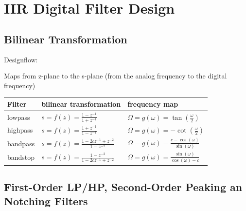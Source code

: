 \section{IIR Digital Filter Design}
\subsection{Bilinear Transformation}
Designflow:
\begin{center}

\end{center}
Maps from z-plane to the s-plane (from the analog frequency to the digital
frequency)

\begin{tabularx}{0.8\textwidth}{|l|X|X|}
	\hline
	\textbf{Filter} & \textbf{bilinear transformation} & \textbf{frequency map}
	\\ \hline
	lowpass &
	$s = f(z) = \frac{1 - z^{-1}}{1 + z^{-1}}$ &
	$ \Omega = g(\omega) = \tan(\frac{\omega}{2})$
	\\ \hline
	highpass &
	$s = f(z) = \frac{1 + z^{-1}}{1 - z^{-1}}$ &
	$ \Omega = g(\omega) = - \cot(\frac{\omega}{2})$
	\\ \hline
	bandpass &
	$s = f(z) = \frac{1 - 2cz^{-1} +z^{-2}}{1 - z^{-2}}$ &
	$ \Omega = g(\omega) = \frac{c - \cos(\omega)}{\sin(\omega)}$
	\\ \hline
	bandstop &
	$s = f(z) = \frac{1 - z^{-2}}{1 - 2cz^{-1} + z^{-2}}$ &
	$ \Omega = g(\omega) = \frac{\sin(\omega)}{\cos(\omega) - c}$
	\\ \hline
\end{tabularx}

\subsection{First-Order LP/HP, Second-Order Peaking an Notching Filters}


